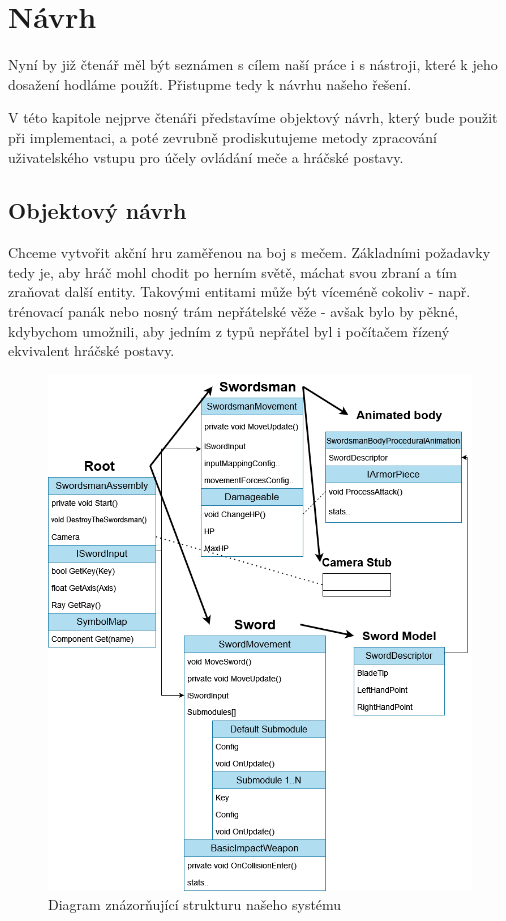 \chapter{Návrh}

Nyní by již čtenář měl být seznámen s cílem naší práce i s nástroji, které k jeho dosažení hodláme použít. Přistupme tedy k návrhu našeho řešení.

V této kapitole nejprve čtenáři představíme objektový návrh, který bude použit při implementaci, a poté zevrubně prodiskutujeme metody zpracování uživatelského vstupu pro účely ovládání meče a hráčské postavy.


\section{Objektový návrh}

Chceme vytvořit akční hru zaměřenou na boj s mečem. Základními požadavky tedy je, aby hráč mohl chodit po herním světě, máchat svou zbraní a tím zraňovat další entity. Takovými entitami může být víceméně cokoliv - např. trénovací panák nebo nosný trám nepřátelské věže - avšak bylo by pěkné, kdybychom umožnili, aby jedním z typů nepřátel byl i počítačem řízený ekvivalent hráčské postavy.

\begin{figure}[p]\centering
    \center
    \includegraphics[width=145mm]{../img/Structure-diagram.png}
    \caption{Diagram znázorňující strukturu našeho systému}
    \label{obr04:objectModelDiagram}
\end{figure} 

